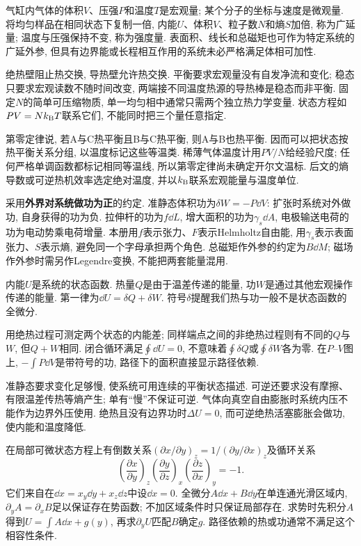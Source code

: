 \label{ch:thermo}
气缸内气体的体积$V$、压强$P$和温度$T$是宏观量; 某个分子的坐标与速度是微观量. 将均匀样品在相同状态下复制一倍, 内能$U$、体积$V$、粒子数$N$和熵$S$加倍, 称为广延量; 温度与压强保持不变, 称为强度量. 表面积、线长和总磁矩也可作为特定系统的广延外参, 但具有边界能或长程相互作用的系统未必严格满足体相可加性.

绝热壁阻止热交换, 导热壁允许热交换. 平衡要求宏观量没有自发净流和变化; 稳态只要求宏观读数不随时间改变, 两端接不同温度热源的导热棒是稳态而非平衡. 固定$N$的简单可压缩物质, 单一均匀相中通常只需两个独立热力学变量. 状态方程如$PV=Nk_{\mathrm B} T$联系它们, 不能同时把三个量任意指定.

第零定律说, 若A与C热平衡且B与C热平衡, 则A与B也热平衡. 因而可以把状态按热平衡关系分组, 以温度标记这些等温类. 稀薄气体温度计用$PV/N$给经验尺度; 任何严格单调函数都标记相同等温线, 所以第零定律尚未确定开尔文温标. 后文的熵导数或可逆热机效率选定绝对温度, 并以$k_{\mathrm B}$联系宏观能量与温度单位.

采用\textbf{外界对系统做功为正}的约定. 准静态体积功为$\delta W=-P\dd V$: 扩张时系统对外做功, 自身获得的功为负. 拉伸杆的功为$f\dd L$, 增大面积的功为$\gamma_s\dd A$, 电极输送电荷的功为电动势乘电荷增量. 本册用$f$表示张力、$F$表示Helmholtz自由能, 用$\gamma_s$表示表面张力、$S$表示熵, 避免同一个字母承担两个角色. 总磁矩作外参的约定为$B\dd M$; 磁场作外参时需另作Legendre变换, 不能把两套能量混用.

\begin{definition}
内能$U$是系统的状态函数. 热量$Q$是由于温差传递的能量, 功$W$是通过其他宏观操作传递的能量. 第一律为$\dd U=\delta Q+\delta W$. 符号$\delta$提醒我们热与功一般不是状态函数的全微分.
\end{definition}
用绝热过程可测定两个状态的内能差; 同样端点之间的非绝热过程则有不同的$Q$与$W$, 但$Q+W$相同. 闭合循环满足$\oint\dd U=0$, 不意味着$\oint\delta Q$或$\oint\delta W$各为零. 在$P$--$V$图上, $-\int P\dd V$是带符号的功, 路径下的面积直接显示路径依赖.

准静态要求变化足够慢, 使系统可用连续的平衡状态描述. 可逆还要求没有摩擦、有限温差传热等熵产生; 单有“慢”不保证可逆. 气体向真空自由膨胀时系统内压不能作为边界外压使用. 绝热且没有边界功时$\Delta U=0$, 而可逆绝热活塞膨胀会做功, 使内能和温度降低.

在局部可微状态方程上有倒数关系$(\partial x/\partial y)_z=1/(\partial y/\partial x)_z$及循环关系
\[
\left(\frac{\partial x}{\partial y}\right)_z
\left(\frac{\partial y}{\partial z}\right)_x
\left(\frac{\partial z}{\partial x}\right)_y=-1.
\]
它们来自在$\dd x=x_y\dd y+x_z\dd z$中设$\dd x=0$. 全微分$A\dd x+B\dd y$在单连通光滑区域内, $\partial_yA=\partial_xB$足以保证存在势函数; 不加区域条件时只保证局部存在. 求势时先积分$A$得到$U=\int A\dd x+g(y)$, 再求$\partial_yU$匹配$B$确定$g$. 路径依赖的热或功通常不满足这个相容性条件.

